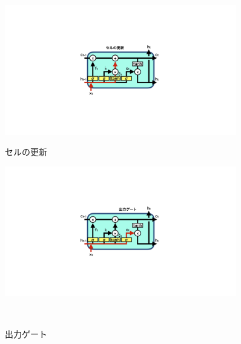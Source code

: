 \begin{figure}[h]
  \begin{minipage}{1.0\textwidth}
  \centering
   \begin{minipage}{0.48\textwidth}
   \centering
    \includegraphics[trim = 600 300 600 300, width=0.9\textwidth, clip]{Figure/2DeepLearning/14CellUpdate.png}
    \caption{セルの更新}
    \label{14CellUpdate}
   \end{minipage}
   \begin{minipage}{0.48\textwidth}
   \centering
    \includegraphics[trim = 600 300 600 300, width=0.9\textwidth, clip]{Figure/2DeepLearning/15OutputGate.png}
    \caption{出力ゲート}
    \label{15OutputGate}
   \end{minipage}
   \end{minipage}
\end{figure}

